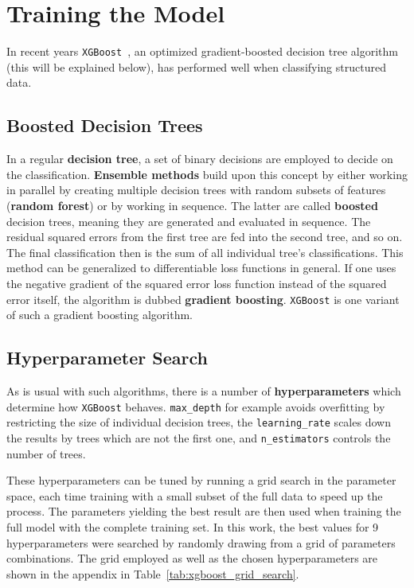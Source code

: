 \section{Training the Model}
In recent years \texttt{XGBoost}~, an optimized gradient-boosted decision tree algorithm (this will be explained below), has performed well when classifying structured data.

\subsection{Boosted Decision Trees}
In a regular \textbf{decision tree}, a set of binary decisions are employed to decide on the classification. \textbf{Ensemble methods} build upon this concept by either working in parallel by creating multiple decision trees with random subsets of features (\textbf{random forest}) or by working in sequence. The latter are called \textbf{boosted} decision trees, meaning they are generated and evaluated in sequence. The residual squared errors from the first tree are fed into the second tree, and so on. The final classification then is the sum of all individual tree's classifications. This method can be generalized to differentiable loss functions in general. If one uses the negative gradient of the squared error loss function instead of the squared error itself, the algorithm is dubbed \textbf{gradient boosting}. \texttt{XGBoost} is one variant of such a gradient boosting algorithm.

\subsection{Hyperparameter Search}
As is usual with such algorithms, there is a number of \textbf{hyperparameters} which determine how \texttt{XGBoost} behaves. \texttt{max\_depth} for example avoids overfitting by restricting the size of individual decision trees, the \texttt{learning\_rate} scales down the results by trees which are not the first one, and \texttt{n\_estimators} controls the number of trees.

These hyperparameters can be tuned by running a grid search in the parameter space, each time training with a small subset of the full data to speed up the process. The parameters yielding the best result are then used when training the full model with the complete training set. In this work, the best values for 9 hyperparameters were searched by randomly drawing from a grid of parameters combinations. The grid employed as well as the chosen hyperparameters are shown in the appendix in Table~\ref{tab:xgboost_grid_search}.

